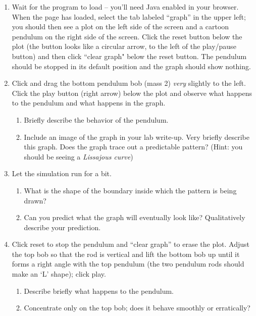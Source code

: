 \documentclass[11pt]{article}
\begin{document}
\begin{enumerate}[resume]
\item Wait for the program to load -- you'll need Java enabled in your browser. When the page has loaded, select the tab labeled ``graph'' in the upper left; you should then see a plot on the left side of the screen and a cartoon pendulum on the right side of the screen. Click the reset button below the plot (the button looks like a circular arrow, to the left of the play/pause button) and then click ``clear graph" below the reset button. The pendulum should be stopped in its default position and the graph should show nothing. 

\item Click and drag the bottom pendulum bob (mass 2) \textit{very} slightly to the left. Click the play button (right arrow) below the plot and observe what happens to the pendulum and what happens in the graph. 
\begin{enumerate}
    \item Briefly describe the behavior of the pendulum.
    
    \item Include an image of the graph in your lab write-up. Very briefly describe this graph. Does the graph trace out a predictable pattern? (Hint: you should be seeing a \emph{Lissajous curve})
\end{enumerate}

\item Let the simulation run for a bit. 
\begin{enumerate}
    \item What is the shape of the boundary inside which the pattern is being drawn?
    
    \item Can you predict what the graph will eventually look like? Qualitatively describe your prediction.
\end{enumerate}

\item Click reset to stop the pendulum and ``clear graph'' to erase the plot. Adjust the top bob so that the rod is vertical and lift the bottom bob up until it forms a right angle with the top pendulum (the two pendulum rods should make an `L' shape); click play.
\begin{enumerate}
    \item Describe briefly what happens to the pendulum.
    
    \item Concentrate only on the top bob; does it behave smoothly or erratically? 
    

\end{enumerate}
\end{enumerate}
\end{document}
